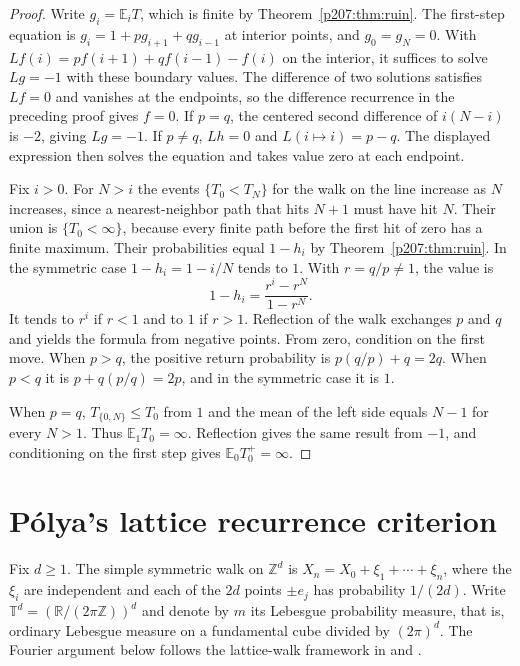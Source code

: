 \documentclass[11pt,oneside,openany]{book}
\theoremstyle{plain}
\theoremstyle{definition}
\theoremstyle{remark}
\begin{document}
\begin{proof}
Write \(g_i=\mathbb E_i T\), which is finite by
Theorem~\ref{p207:thm:ruin}. The first-step equation is
\(g_i=1+p g_{i+1}+q g_{i-1}\) at interior points, and
\(g_0=g_N=0\). With \(L f(i)=p f(i+1)+q f(i-1)-f(i)\) on the interior,
it suffices to solve \(L g=-1\) with these boundary values.
The difference of two solutions satisfies \(L f=0\) and vanishes at
the endpoints, so the difference recurrence in the preceding proof
gives \(f=0\). If \(p=q\), the centered second difference of
\(i(N-i)\) is \(-2\), giving \(L g=-1\).
If \(p\ne q\), \(Lh=0\) and \(L(i\mapsto i)=p-q\). The displayed
expression then solves the equation and takes value zero at each
endpoint.

Fix \(i>0\). For \(N>i\) the events \(\{T_0<T_N\}\) for the walk on the
line increase as \(N\) increases, since a nearest-neighbor path that
hits \(N+1\) must have hit \(N\). Their union is \(\{T_0<\infty\}\),
because every finite path before the first hit of zero has a finite
maximum. Their probabilities equal \(1-h_i\) by
Theorem~\ref{p207:thm:ruin}. In the symmetric case \(1-h_i=1-i/N\)
tends to \(1\). With \(r=q/p\ne 1\), the value is
\[
 1-h_i=\frac{r^i-r^N}{1-r^N}.
\]
It tends to \(r^i\) if \(r<1\) and to \(1\) if \(r>1\).
Reflection of the walk exchanges \(p\) and \(q\) and yields the
formula from negative points. From zero, condition on the first move.
When \(p>q\), the positive return probability is \(p(q/p)+q=2q\).
When \(p<q\) it is \(p+q(p/q)=2p\), and in the symmetric case it is \(1\).

When \(p=q\), \(T_{\{0,N\}}\leq T_0\) from \(1\) and the mean of the left
side equals \(N-1\) for every \(N>1\). Thus
\(\mathbb E_1T_0=\infty\). Reflection gives the same result from \(-1\),
and conditioning on the first step gives
\(\mathbb E_0 T_0^+=\infty\).
\end{proof}

\section{Pólya's lattice recurrence criterion}\label{p207:W22}

Fix \(d\geq 1\). The simple symmetric walk on \(\mathbb Z^d\) is
\(X_n=X_0+\xi_1+\cdots+\xi_n\), where the \(\xi_i\) are independent and
each of the \(2d\) points \(\pm e_j\) has probability \(1/(2d)\).
Write \(\mathbb T^d=(\mathbb R/(2\pi\mathbb Z))^d\) and denote by \(m\)
its Lebesgue probability measure, that is, ordinary Lebesgue measure
on a fundamental cube divided by \((2\pi)^d\).
The Fourier argument below follows the lattice-walk framework in
\cite[\S5.4]{Durrett} and \cite[\S3.8]{Knill}.
\end{document}
